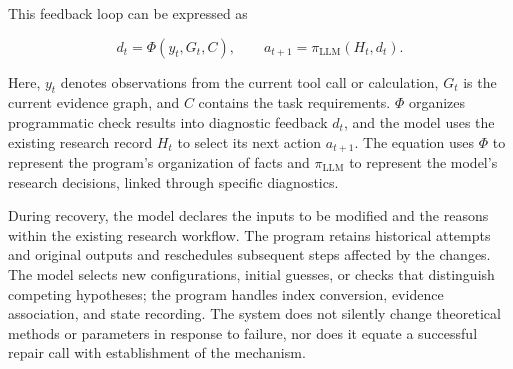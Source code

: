 This feedback loop can be expressed as

\begin{equation}\label{eq:methods-15}
d_t=\Phi(y_t,G_t,C),\qquad
a_{t+1}=\pi_{\mathrm{LLM}}(H_t,d_t).
\end{equation}

Here, $y_t$ denotes observations from the current tool call or calculation, $G_t$ is the current evidence graph, and $C$ contains the task requirements. $\Phi$ organizes programmatic check results into diagnostic feedback $d_t$, and the model uses the existing research record $H_t$ to select its next action $a_{t+1}$. The equation uses $\Phi$ to represent the program's organization of facts and $\pi_{\mathrm{LLM}}$ to represent the model's research decisions, linked through specific diagnostics.

During recovery, the model declares the inputs to be modified and the reasons within the existing research workflow. The program retains historical attempts and original outputs and reschedules subsequent steps affected by the changes. The model selects new configurations, initial guesses, or checks that distinguish competing hypotheses; the program handles index conversion, evidence association, and state recording. The system does not silently change theoretical methods or parameters in response to failure, nor does it equate a successful repair call with establishment of the mechanism.

